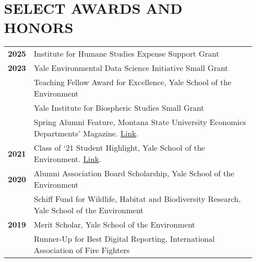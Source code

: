 \documentclass[11pt]{article}
\begin{document}
\section*{SELECT AWARDS AND HONORS}
\begin{longtable}{>{\bfseries}r p{5.5in}}%
2025 & Institute for Humane Studies Expense Support Grant\\
2023 & Yale Environmental Data Science Initiative Small Grant \\
    & Teaching Fellow Award for Excellence, Yale School of the Environment \\
    & Yale Institute for Biospheric Studies Small Grant \\
    & Spring Alumni Feature, Montana State University Economics Departments' Magazine. \href{https://www.montana.edu/econ/newsletters/Spring23NewsletterforWeb.pdf}{Link}. \\[1ex]
2021 & Class of ‘21 Student Highlight, Yale School of the Environment. \href{https://environment.yale.edu/news/article/andie-creel-putting-a-value-on-natural-resources?fbclid=IwAR1W1Rz9sNbyTzKgDEBLVM3TMJjhzOWkP5_6f4-cbtQmrNaF4BSW2MLQHGo}{Link}. \\[1ex]
2020 & Alumni Association Board Scholarship, Yale School of the Environment \\
    & Schiff Fund for Wildlife, Habitat and Biodiversity Research, Yale School of the Environment \\[1ex]
2019 & Merit Scholar, Yale School of the Environment \\
    & Runner-Up for Best Digital Reporting, International Association of Fire Fighters \\[1ex]

\end{longtable}
\end{document}
